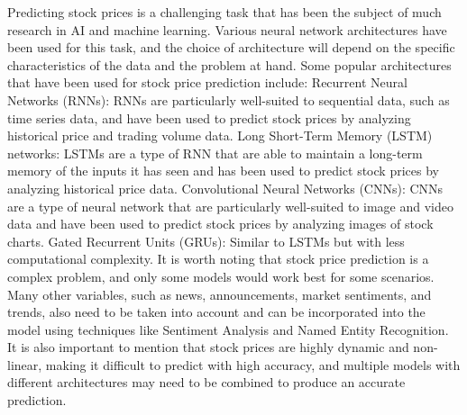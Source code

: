 \documentclass[a4paper,twoside,12pt]{book}
\begin{document}
\begin{itemize}
Predicting stock prices is a challenging task that has been the subject of much research in AI and machine learning. Various neural network architectures have been used for this task, and the choice of architecture will depend on the specific characteristics of the data and the problem at hand.
Some popular architectures that have been used for stock price prediction include:
Recurrent Neural Networks (RNNs): RNNs are particularly well-suited to sequential data, such as time series data, and have been used to predict stock prices by analyzing historical price and trading volume data.
Long Short-Term Memory (LSTM) networks: LSTMs are a type of RNN that are able to maintain a long-term memory of the inputs it has seen and has been used to predict stock prices by analyzing historical price data.
Convolutional Neural Networks (CNNs): CNNs are a type of neural network that are particularly well-suited to image and video data and have been used to predict stock prices by analyzing images of stock charts.
Gated Recurrent Units (GRUs): Similar to LSTMs but with less computational complexity.
It is worth noting that stock price prediction is a complex problem, and only some models would work best for some scenarios. Many other variables, such as news, announcements, market sentiments, and trends, also need to be taken into account and can be incorporated into the model using techniques like Sentiment Analysis and Named Entity Recognition.
It is also important to mention that stock prices are highly dynamic and non-linear, making it difficult to predict with high accuracy, and multiple models with different architectures may need to be combined to produce an accurate prediction.



\end{itemize}
\end{document}
